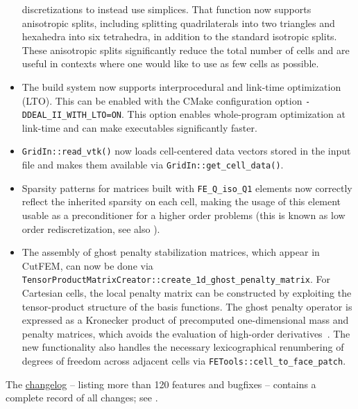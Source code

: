 \documentclass{ansarticle-preprint}
\begin{document}
\begin{itemize}
  discretizations to instead use simplices. That function now supports
  anisotropic splits, including splitting quadrilaterals into two triangles and
  hexahedra into six tetrahedra, in addition to the standard isotropic splits.
  These anisotropic splits significantly reduce the total number of cells and
  are useful in contexts where one would like to use as few cells as
  possible.
\item The build system now supports interprocedural and link-time optimization
  (LTO). This can be enabled with the CMake configuration option
  \texttt{-DDEAL\_II\_WITH\_LTO=ON}. This option enables whole-program
  optimization at link-time and can make executables significantly faster.
\item \texttt{GridIn::read\_vtk()} now loads cell-centered data vectors stored
  in the input file and makes them available via
  \texttt{GridIn::get\_cell\_data()}.
\item Sparsity patterns for matrices built with \texttt{FE\_Q\_iso\_Q1} elements
  now correctly reflect the inherited sparsity on each cell, making the usage of
  this element usable as a preconditioner for a higher order problems (this is known
  as low order rediscretization, see also \cite{pazner2023low}).
  \item The assembly of ghost penalty stabilization matrices, which appear in CutFEM, can now be done 
    via \texttt{TensorProductMatrixCreator::create\_1d\_ghost\_penalty\_matrix}. For Cartesian cells, the local penalty matrix can be constructed by exploiting the tensor-product structure   
    of the basis functions. The ghost penalty operator is expressed as 
    a Kronecker product of precomputed one-dimensional mass and penalty matrices,
    which avoids the evaluation of high-order derivatives~\cite{wichrowski2025matrix}.
    The new functionality also handles the necessary lexicographical renumbering 
    of degrees of freedom across adjacent cells via \texttt{FETools::cell\_to\_face\_patch}.
\end{itemize}
%
The
\href{https://dealii.org/current/doxygen/deal.II/changes_between_9_6_0_and_9_7_0.html}{changelog}
-- listing more than 120
features and bugfixes --
contains a complete record of all changes; see \cite{changes97}.



\end{document}
